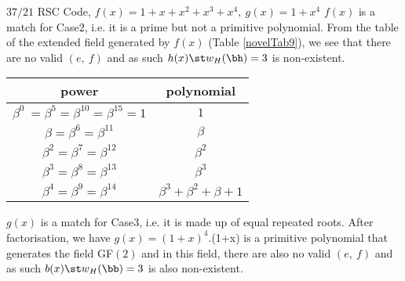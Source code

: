 \newpage

 
 \begin{example}
$37/21$ RSC Code, $f(x)=1+x+x^2+x^3+x^4,~g(x)=1+x^4$\newline
$f(x)$ is a match for Case2, i.e. it is a prime but not a primitive polynomial. From the table of the extended field generated by $f(x)$ (Table \ref{novelTab9}), we see that there are no valid $(e,~f)$ and as such $h(x) \st w_H(\bh)=3$ is non-existent.


 \begin{table*}[h]
 \caption{Non-zero Elements of GF$(2^2)$ generated by $f(x)=1+x+x^2+x^3+x^4$}
\centering
 \begin{tabular}{c c} 
 \hline
 power & polynomial \\ [0.5ex] 
 \hline\hline
$\beta^0~=\beta^5=\beta^{10}=\beta^{15}=1$ & $1$\\
\hline
$\beta=\beta^6=\beta^{11}$ & $\beta$\\
\hline
$\beta^2=\beta^7=\beta^{12}$ &  $\beta^2$\\
\hline
$\beta^3=\beta^8=\beta^{13}$ &  $\beta^3$\\
\hline
$\beta^4=\beta^9=\beta^{14}$ &  $\beta^3+\beta^2+\beta+1$\\
 \end{tabular}
 \label{novelTab9}
\end{table*}

$g(x)$ is a match for Case3, i.e. it is made up of equal repeated roots. After factorisation, we have $g(x)=(1+x)^4. $(1+x) is a primitive polynomial that generates the field GF$(2)$ and in this field, there are also no valid $(e,~f)$ and as such $b(x) \st w_H(\bb)=3$ is also non-existent.
\end{example}
 
